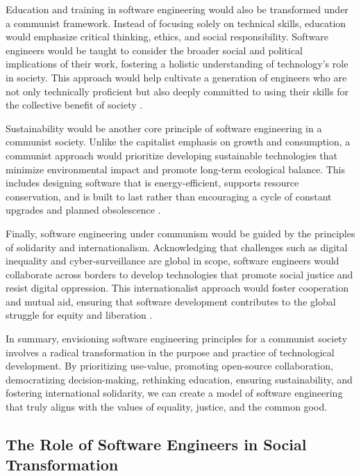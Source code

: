 \begin{refsection}
Education and training in software engineering would also be transformed under a communist framework. Instead of focusing solely on technical skills, education would emphasize critical thinking, ethics, and social responsibility. Software engineers would be taught to consider the broader social and political implications of their work, fostering a holistic understanding of technology's role in society. This approach would help cultivate a generation of engineers who are not only technically proficient but also deeply committed to using their skills for the collective benefit of society \cite[pp.~43-47]{vygotskyMind1980}.

Sustainability would be another core principle of software engineering in a communist society. Unlike the capitalist emphasis on growth and consumption, a communist approach would prioritize developing sustainable technologies that minimize environmental impact and promote long-term ecological balance. This includes designing software that is energy-efficient, supports resource conservation, and is built to last rather than encouraging a cycle of constant upgrades and planned obsolescence \cite[pp.~80-85]{kleinShock2021}.

Finally, software engineering under communism would be guided by the principles of solidarity and internationalism. Acknowledging that challenges such as digital inequality and cyber-surveillance are global in scope, software engineers would collaborate across borders to develop technologies that promote social justice and resist digital oppression. This internationalist approach would foster cooperation and mutual aid, ensuring that software development contributes to the global struggle for equity and liberation \cite[pp.~145-150]{fuchsDigitalLabour2014}.

In summary, envisioning software engineering principles for a communist society involves a radical transformation in the purpose and practice of technological development. By prioritizing use-value, promoting open-source collaboration, democratizing decision-making, rethinking education, ensuring sustainability, and fostering international solidarity, we can create a model of software engineering that truly aligns with the values of equality, justice, and the common good.

\subsection{The Role of Software Engineers in Social Transformation}


\end{refsection}
